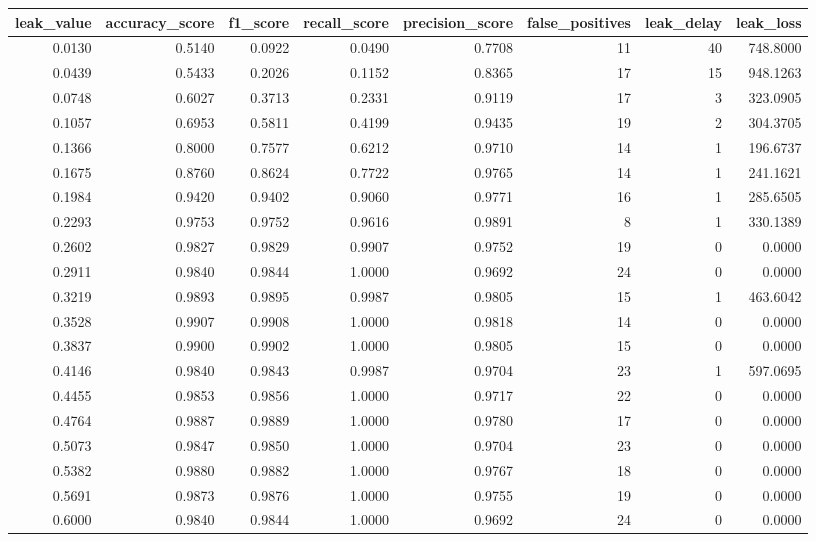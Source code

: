 \begin{tabular}{rrrrrrrr}
\toprule
leak\_value & accuracy\_score & f1\_score & recall\_score & precision\_score & false\_positives & leak\_delay & leak\_loss \\
\midrule
0.0130 & 0.5140 & 0.0922 & 0.0490 & 0.7708 & 11 & 40 & 748.8000 \\
0.0439 & 0.5433 & 0.2026 & 0.1152 & 0.8365 & 17 & 15 & 948.1263 \\
0.0748 & 0.6027 & 0.3713 & 0.2331 & 0.9119 & 17 & 3 & 323.0905 \\
0.1057 & 0.6953 & 0.5811 & 0.4199 & 0.9435 & 19 & 2 & 304.3705 \\
0.1366 & 0.8000 & 0.7577 & 0.6212 & 0.9710 & 14 & 1 & 196.6737 \\
0.1675 & 0.8760 & 0.8624 & 0.7722 & 0.9765 & 14 & 1 & 241.1621 \\
0.1984 & 0.9420 & 0.9402 & 0.9060 & 0.9771 & 16 & 1 & 285.6505 \\
0.2293 & 0.9753 & 0.9752 & 0.9616 & 0.9891 & 8 & 1 & 330.1389 \\
0.2602 & 0.9827 & 0.9829 & 0.9907 & 0.9752 & 19 & 0 & 0.0000 \\
0.2911 & 0.9840 & 0.9844 & 1.0000 & 0.9692 & 24 & 0 & 0.0000 \\
0.3219 & 0.9893 & 0.9895 & 0.9987 & 0.9805 & 15 & 1 & 463.6042 \\
0.3528 & 0.9907 & 0.9908 & 1.0000 & 0.9818 & 14 & 0 & 0.0000 \\
0.3837 & 0.9900 & 0.9902 & 1.0000 & 0.9805 & 15 & 0 & 0.0000 \\
0.4146 & 0.9840 & 0.9843 & 0.9987 & 0.9704 & 23 & 1 & 597.0695 \\
0.4455 & 0.9853 & 0.9856 & 1.0000 & 0.9717 & 22 & 0 & 0.0000 \\
0.4764 & 0.9887 & 0.9889 & 1.0000 & 0.9780 & 17 & 0 & 0.0000 \\
0.5073 & 0.9847 & 0.9850 & 1.0000 & 0.9704 & 23 & 0 & 0.0000 \\
0.5382 & 0.9880 & 0.9882 & 1.0000 & 0.9767 & 18 & 0 & 0.0000 \\
0.5691 & 0.9873 & 0.9876 & 1.0000 & 0.9755 & 19 & 0 & 0.0000 \\
0.6000 & 0.9840 & 0.9844 & 1.0000 & 0.9692 & 24 & 0 & 0.0000 \\
\bottomrule
\end{tabular}

